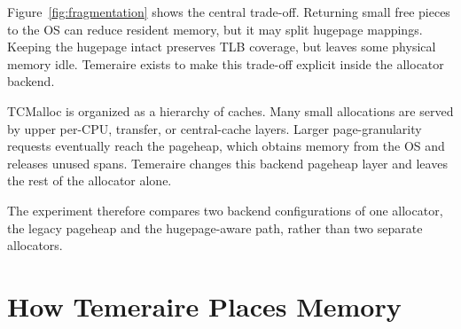 \documentclass[sigconf]{acmart}
\begin{document}
Figure~\ref{fig:fragmentation} shows the central trade-off. Returning small
free pieces to the OS can reduce resident memory, but it may split hugepage
mappings. Keeping the hugepage intact preserves TLB coverage, but leaves some
physical memory idle. Temeraire exists to make this trade-off explicit inside
the allocator backend.

TCMalloc is organized as a hierarchy of caches. Many small allocations are
served by upper per-CPU, transfer, or central-cache layers. Larger
page-granularity requests eventually reach the pageheap, which obtains memory
from the OS and releases unused spans. Temeraire changes this backend pageheap layer and leaves the rest of the
allocator alone.

The experiment therefore compares two backend configurations of one allocator,
the legacy pageheap and the hugepage-aware path, rather than two separate
allocators.

\section{How Temeraire Places Memory}
\label{sec:temeraire-placement}
\end{document}
